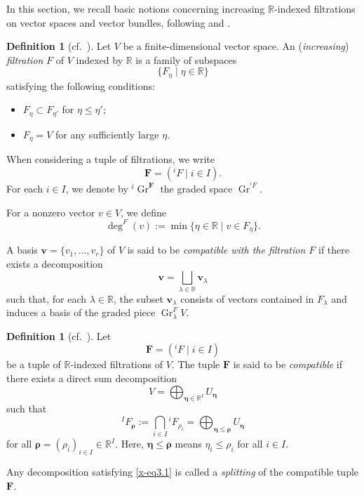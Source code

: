 \documentclass[12pt,twoside]{amsart}
\DeclareMathOperator{\Gr}{Gr}
\theoremstyle{definition}
\newtheorem{defn}[thm]{Definition}
\begin{document}
In this section, we recall basic notions concerning increasing
$\mathbb R$-indexed filtrations on vector spaces and vector bundles,
following \cite{mochizuki1} and \cite{mochizuki3}.

\begin{defn}[{cf.~\cite[Definition 4.1]{mochizuki3}}]\label{x-def3.1}
Let $V$ be a finite-dimensional vector space.
An ({\em{increasing}}) {\em{filtration}} $F$ of $V$ indexed by $\mathbb R$
is a family of subspaces
\[
\{F_\eta \mid \eta\in\mathbb R\}
\]
satisfying the following conditions:
\begin{itemize}
\item $F_\eta \subset F_{\eta'}$ for $\eta \le \eta'$;
\item $F_\eta = V$ for any sufficiently large $\eta$.
\end{itemize}

When considering a tuple of filtrations, we write
\[
\mathbf F = ({}^i\!F \mid i\in I).
\]
For each $i\in I$, we denote by ${}^i\!\Gr^{\mathbf F}$ the graded space
$\Gr^{{}^i\!F}$.

For a nonzero vector $v\in V$, we define
\[
\deg^F(v) := \min\{\eta\in\mathbb R \mid v\in F_\eta\}.
\]

A basis $\bm v=\{v_1,\ldots,v_r\}$ of $V$ is said to be
\emph{compatible with the filtration $F$} if there exists a decomposition
\[
\bm v = \bigsqcup_{\lambda\in\mathbb R} \bm v_\lambda
\]
such that, for each $\lambda\in\mathbb R$,
the subset $\bm v_\lambda$ consists of vectors contained in $F_\lambda$
and induces a basis of the graded piece $\Gr^F_\lambda V$.
\end{defn}

\begin{defn}[{cf.~\cite[Definition 4.2]{mochizuki3}}]\label{x-def3.2}
Let
\[
\mathbf F = ({}^i\!F \mid i\in I)
\]
be a tuple of $\mathbb R$-indexed filtrations of $V$.
The tuple $\mathbf F$ is said to be \emph{compatible} if there exists
a direct sum decomposition
\[
V = \bigoplus_{\bm\eta\in\mathbb R^I} U_{\bm\eta}
\]
such that
\begin{equation}\label{x-eq3.1}
{}^I\!F_{\bm\rho}
:= \bigcap_{i\in I} {}^i\!F_{\rho_i}
= \bigoplus_{\bm\eta\le \bm\rho} U_{\bm\eta}
\end{equation}
for all $\bm\rho=(\rho_i)_{i\in I}\in\mathbb R^I$.
Here, $\bm\eta\le\bm\rho$ means $\eta_i\le\rho_i$ for all $i\in I$.

Any decomposition satisfying \eqref{x-eq3.1} is called a
\emph{splitting} of the compatible tuple $\mathbf F$.
\end{defn}
\end{document}
